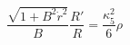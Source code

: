 \begin{equation}
\frac{\sqrt{1+B^2\dot r^2}}{B}\frac{R'}{R}=\frac{\kappa_5^2}{6}\rho
\end{equation}


